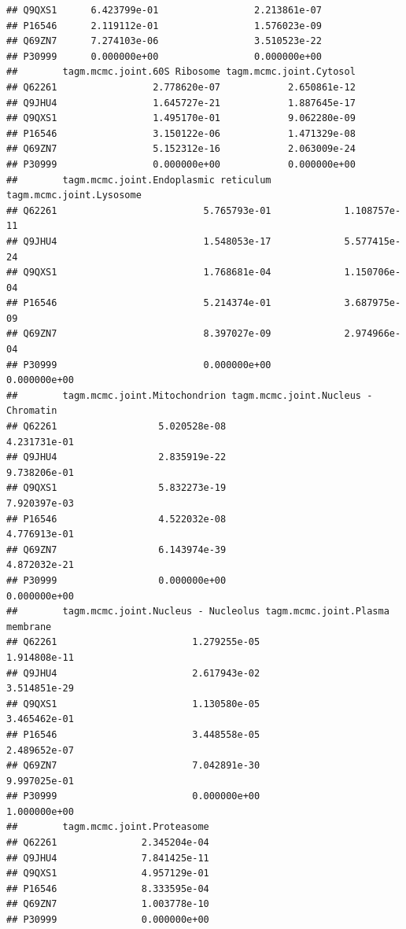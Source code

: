 \documentclass[
]{article}
\begin{document}
\begin{verbatim}
## Q9QXS1      6.423799e-01                 2.213861e-07
## P16546      2.119112e-01                 1.576023e-09
## Q69ZN7      7.274103e-06                 3.510523e-22
## P30999      0.000000e+00                 0.000000e+00
##        tagm.mcmc.joint.60S Ribosome tagm.mcmc.joint.Cytosol
## Q62261                 2.778620e-07            2.650861e-12
## Q9JHU4                 1.645727e-21            1.887645e-17
## Q9QXS1                 1.495170e-01            9.062280e-09
## P16546                 3.150122e-06            1.471329e-08
## Q69ZN7                 5.152312e-16            2.063009e-24
## P30999                 0.000000e+00            0.000000e+00
##        tagm.mcmc.joint.Endoplasmic reticulum tagm.mcmc.joint.Lysosome
## Q62261                          5.765793e-01             1.108757e-11
## Q9JHU4                          1.548053e-17             5.577415e-24
## Q9QXS1                          1.768681e-04             1.150706e-04
## P16546                          5.214374e-01             3.687975e-09
## Q69ZN7                          8.397027e-09             2.974966e-04
## P30999                          0.000000e+00             0.000000e+00
##        tagm.mcmc.joint.Mitochondrion tagm.mcmc.joint.Nucleus - Chromatin
## Q62261                  5.020528e-08                        4.231731e-01
## Q9JHU4                  2.835919e-22                        9.738206e-01
## Q9QXS1                  5.832273e-19                        7.920397e-03
## P16546                  4.522032e-08                        4.776913e-01
## Q69ZN7                  6.143974e-39                        4.872032e-21
## P30999                  0.000000e+00                        0.000000e+00
##        tagm.mcmc.joint.Nucleus - Nucleolus tagm.mcmc.joint.Plasma membrane
## Q62261                        1.279255e-05                    1.914808e-11
## Q9JHU4                        2.617943e-02                    3.514851e-29
## Q9QXS1                        1.130580e-05                    3.465462e-01
## P16546                        3.448558e-05                    2.489652e-07
## Q69ZN7                        7.042891e-30                    9.997025e-01
## P30999                        0.000000e+00                    1.000000e+00
##        tagm.mcmc.joint.Proteasome
## Q62261               2.345204e-04
## Q9JHU4               7.841425e-11
## Q9QXS1               4.957129e-01
## P16546               8.333595e-04
## Q69ZN7               1.003778e-10
## P30999               0.000000e+00
\end{verbatim}
\end{document}
